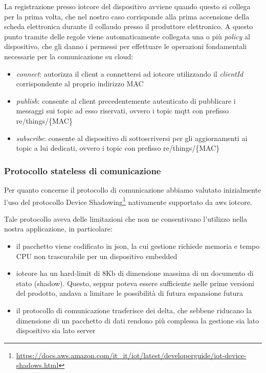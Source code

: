 \documentclass[12pt,a4paper,twoside,titlepage]{book}
\begin{document}
La registrazione presso \Gls{iotcore} del dispositivo avviene quando questo si collega per la prima 
volta, che nel nostro caso corrisponde alla prima accensione della scheda elettronica durante il collaudo 
presso il produttore elettronico. A questo punto tramite delle regole viene automaticamente collegata 
una o più \textit{policy} al dispositivo, che gli danno i permessi per effettuare le operazioni fondamentali 
necessarie per la comunicazione su \gls{cloud}:

\begin{itemize}
    \item \textit{connect}: autorizza il client a connettersi ad \Gls{iotcore} utilizzando il \textit{clientId}
        corrispondente al proprio indirizzo MAC
    \item \textit{publish}: consente al client precedentemente autenticato di pubblicare i messaggi sui topic ad 
        esso riservati, ovvero i \gls{topic} \Gls{mqtt} con prefisso \textrm{re/things/\{MAC\}}
    \item \textit{subscribe}: consente al dispositivo di sottoscriversi per gli aggiornamenti ai topic a lui dedicati, 
        ovvero i \gls{topic} con prefisso \textrm{re/things/\{MAC\}}
\end{itemize}

\subsubsection{Protocollo stateless di comunicazione}

Per quanto concerne il protocollo di comunicazione abbiamo valutato inizialmente
l'uso del protocollo Device Shadowing\footnote{\url{https://docs.aws.amazon.com/it\_it/iot/latest/developerguide/iot-device-shadows.html}}
nativamente supportato da \Gls{aws} \Gls{iotcore}.

Tale protocollo aveva delle limitazioni che non ne consentivano l'utilizzo nella nostra
applicazione, in particolare:

\begin{itemize}
    \item il pacchetto viene codificato in \acrshort{json}, la cui gestione richiede memoria
        e tempo CPU non trascurabile per un dispositivo embedded
    \item \Gls{iotcore} ha un hard-limit di 8Kb di dimensione massima di un documento di stato (shadow).
        Questo, seppur poteva essere sufficiente nelle prime versioni del prodotto, andava
        a limitare le possibilità di futura espansione futura
    \item il protocollo di comunicazione trasferisce dei delta, che sebbene riducano la
        dimensione di un pacchetto di dati rendono più complessa la gestione sia lato dispositivo 
        sia lato server
\end{itemize}
\end{document}
